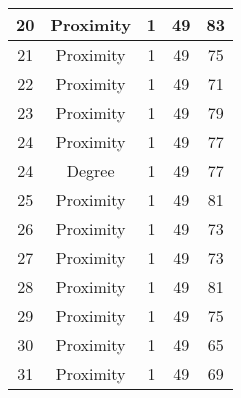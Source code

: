 \documentclass[results.tex]{subfiles}
\begin{document}
\begin{center}
\begin{tabular}{| c || c | c | c | c |}
            \hline
            20                      & Proximity                    & 1                      & 49                      & 83                   \\
            \hline
            21                      & Proximity                    & 1                      & 49                      & 75                   \\
            \hline
            22                      & Proximity                    & 1                      & 49                      & 71                   \\
            \hline
            23                      & Proximity                    & 1                      & 49                      & 79                   \\
            \hline
            24                      & Proximity                    & 1                      & 49                      & 77                   \\
            \hline
            24                      & Degree                       & 1                      & 49                      & 77                   \\
            \hline
            25                      & Proximity                    & 1                      & 49                      & 81                   \\
            \hline
            26                      & Proximity                    & 1                      & 49                      & 73                   \\
            \hline
            27                      & Proximity                    & 1                      & 49                      & 73                   \\
            \hline
            28                      & Proximity                    & 1                      & 49                      & 81                   \\
            \hline
            29                      & Proximity                    & 1                      & 49                      & 75                   \\
            \hline
            30                      & Proximity                    & 1                      & 49                      & 65                   \\
            \hline
            31                      & Proximity                    & 1                      & 49                      & 69                   \\

\end{tabular}
\end{center}
\end{document}
